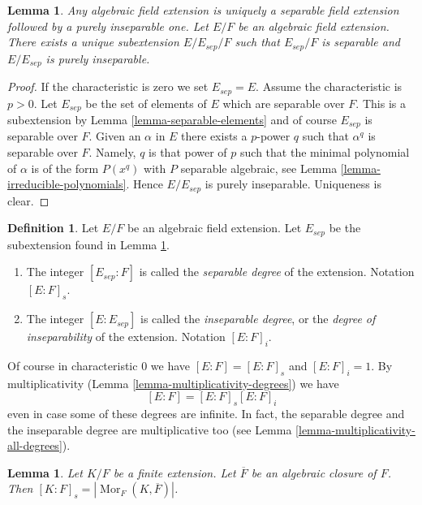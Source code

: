 \documentclass{stacks-project}
\newenvironment{slogan}{\comment}{\endcomment}
\theoremstyle{plain}
\newtheorem{lemma}[subsection]{Lemma}
\theoremstyle{definition}
\newtheorem{definition}[subsection]{Definition}
\theoremstyle{remark}
\numberwithin{equation}{subsection}
\def\Mor{\mathop{\mathrm{Mor}}\nolimits}
\begin{document}
\begin{lemma}
\label{lemma-separable-first}
\begin{slogan}
Any algebraic field extension is uniquely a separable field extension
followed by a purely inseparable one.
\end{slogan}
Let $E/F$ be an algebraic field extension. There exists a unique subextension
$E/E_{sep}/F$ such that $E_{sep}/F$ is separable and $E/E_{sep}$ is
purely inseparable.
\end{lemma}

\begin{proof}
If the characteristic is zero we set $E_{sep} = E$. Assume the characteristic
is $p > 0$. Let $E_{sep}$ be the set of elements of $E$ which are separable
over $F$. This is a subextension by Lemma \ref{lemma-separable-elements}
and of course $E_{sep}$ is separable over $F$. Given an $\alpha$ in $E$
there exists a $p$-power $q$ such that $\alpha^q$ is separable over $F$.
Namely, $q$ is that power of $p$ such that the minimal polynomial of
$\alpha$ is of the form $P(x^q)$ with $P$ separable algebraic, see
Lemma \ref{lemma-irreducible-polynomials}. Hence $E/E_{sep}$ is purely
inseparable. Uniqueness is clear.
\end{proof}

\begin{definition}
\label{definition-insep-degree}
Let $E/F$ be an algebraic field extension. Let $E_{sep}$ be the subextension
found in Lemma \ref{lemma-separable-first}.
\begin{enumerate}
\item The integer $[E_{sep} : F]$ is called the {\it separable
degree} of the extension. Notation $[E : F]_s$.
\item The integer $[E : E_{sep}]$ is called the {\it inseparable
degree}, or the {\it degree of inseparability} of the extension.
Notation $[E : F]_i$.
\end{enumerate}
\end{definition}

\noindent
Of course in characteristic $0$ we have $[E : F] = [E : F]_s$ and
$[E : F]_i = 1$. By multiplicativity
(Lemma \ref{lemma-multiplicativity-degrees}) we have
$$
[E : F] = [E : F]_s [E : F]_i
$$
even in case some of these degrees are infinite. In fact, the separable
degree and the inseparable degree are multiplicative too (see
Lemma \ref{lemma-multiplicativity-all-degrees}).

\begin{lemma}
\label{lemma-separable-degree}
Let $K/F$ be a finite extension. Let $\overline{F}$ be an algebraic
closure of $F$. Then $[K : F]_s = |\Mor_F(K, \overline{F})|$.
\end{lemma}
\end{document}
